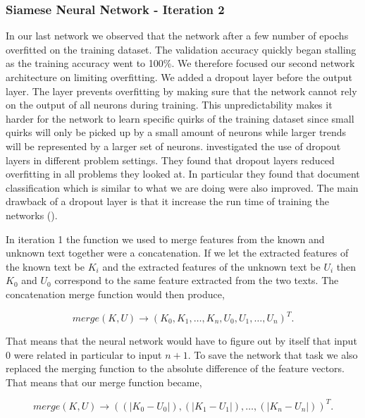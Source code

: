 \subsubsection{Siamese Neural Network - Iteration 2}


In our last network we observed that the network after a few number of epochs
overfitted on the training dataset. The validation accuracy quickly began
stalling as the training accuracy went to 100\%. We therefore focused our
second network architecture on limiting overfitting. We added a dropout layer
before the output layer. The layer prevents overfitting by making sure that
the network cannot rely on the output of all neurons during training. This
unpredictability makes it harder for the network to learn specific quirks of
the training dataset since small quirks will only be picked up by a small
amount of neurons while larger trends will be represented by a larger set
of neurons. \cite{JMLR:v15:srivastava14a} investigated the use of dropout
layers in different problem settings. They found that dropout layers reduced
overfitting in all problems they looked at. In particular they found that
document classification which is similar to what we are doing were also
improved. The main drawback of a dropout layer is that it increase the run time
of training the networks (\cite{JMLR:v15:srivastava14a}).

In iteration 1 the function we used to merge features from the known and unknown
text together were a concatenation. If we let the extracted features of the
known text be $K_i$ and the extracted features of the unknown text be $U_i$ then
$K_0$ and $U_0$ correspond to the same feature extracted from the two texts. The
concatenation merge function would then produce,

\begin{equation}
    merge(K, U) \rightarrow \left(
        K_0, K_1, \dots, K_n, U_0, U_1, \dots, U_n
    \right)^T.
\end{equation}

That means that the neural network would have to figure out by itself that input
$0$ were related in particular to input $n + 1$. To save the network that task
we also replaced the merging function to the absolute difference of the feature
vectors. That means that our merge function became,

\begin{equation}
    merge(K, U) \rightarrow \left(
        (|K_0 - U_0|), (|K_1 - U_1|), \dots, (|K_n - U_n|)
    \right)^T.
\end{equation}

